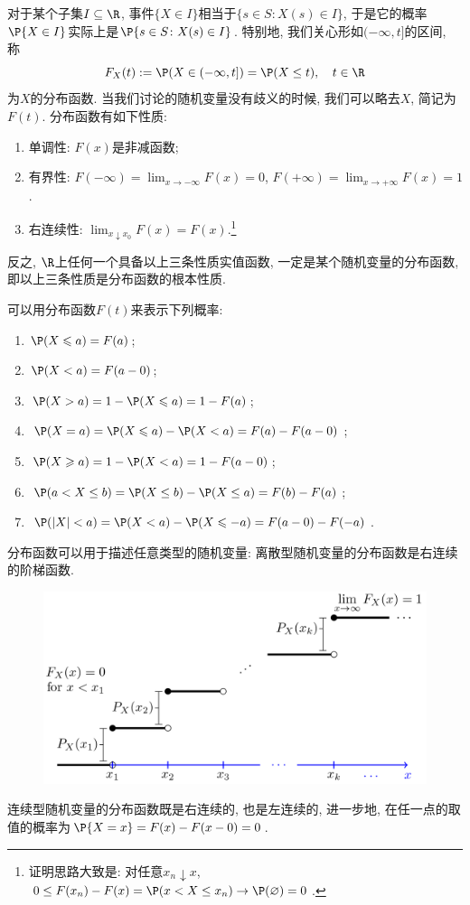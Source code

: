 \documentclass[11pt]{ctexart}
\begin{document}
对于某个子集$I \subseteq \R$, 事件$\{X \in I\}$相当于$\{s \in S \colon X(s) \in I\}$, 于是它的概率$\P\{X \in I\}$实际上是$\P\{s \in S \colon X(s) \in I\}$. 
特别地, 我们关心形如$(- \infty, t]$的区间, 称
\begin{equation*}
	F_X(t) := \P(X \in (-\infty, t]) = \P(X \leq t), \quad t \in \R
\end{equation*}
为$X$的{\keben 分布函数}. 
当我们讨论的随机变量没有歧义的时候, 我们可以略去$X$, 简记为$F(t)$.
分布函数有如下性质: 
\begin{enumerate}[label=(\arabic*)]
	\item {\keben 单调性:} $F(x)$是非减函数; 
	\item {\keben 有界性:} $F(-\infty) = \lim_{x \to -\infty}F(x) = 0$, $F(+\infty) = \lim_{x \to +\infty}F(x) = 1$. 
	\item {\keben 右连续性:} $\lim_{x \downarrow x_0}F(x) = F(x)$.\footnote{证明思路大致是: 对任意$x_n \downarrow x$, $0 \leq F(x_n) - F(x) = \P(x < X \leq x_n) \to \P(\varnothing) = 0$. }
\end{enumerate}
反之, $\R$上任何一个具备以上三条性质实值函数, 一定是某个随机变量的分布函数, 即以上三条性质是分布函数的根本性质. 

可以用分布函数$F(t)$来表示下列概率: 
\begin{enumerate}[label=(\arabic*)]
	\item $\P(X \leqslant a)=F(a)$;
	\item $\P(X<a)=F(a-0)$;
	\item $\P(X>a)=1-\P(X \leqslant a)=1-F(a)$;
	\item $\P(X=a)=\P(X \leqslant a)-\P(X<a)=F(a)-F(a-0)$;
	\item $\P(X \geqslant a)=1-\P(X<a)=1-F(a-0)$;
	\item $\P(a < X \leq b) = \P(X \leq b) - \P(X \leq a) = F(b) - F(a)$; 
	\item $\P(|X|<a)=\P(X<a)-\P(X \leqslant-a)=F(a-0)-F(-a)$. 
\end{enumerate}


分布函数可以用于描述任意类型的随机变量: 
离散型随机变量的分布函数是右连续的阶梯函数.
\begin{figure}[H]
	\centering
	\includegraphics[width = .7 \textwidth]{figure/CDF-Discrete_b.png}
\end{figure}
\noindent
连续型随机变量的分布函数既是右连续的, 也是左连续的, 进一步地, 在任一点的取值的概率为$\P\{X = x\} = F(x) - F(x - 0) = 0$. 
\end{document}
